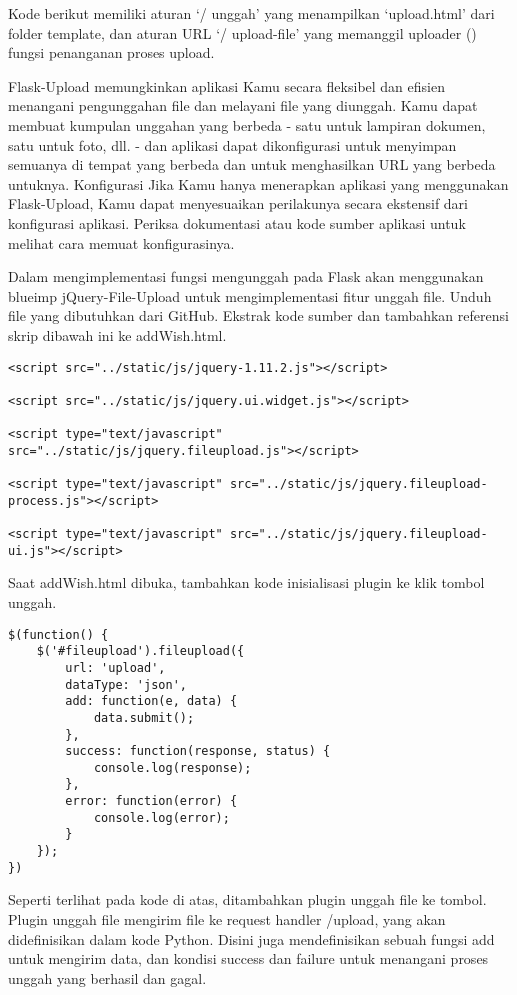 \documentclass[12pt,a4paper]{article}
\begin{document}
Kode berikut memiliki aturan ‘/ unggah’ yang menampilkan ‘upload.html’ dari folder template, dan aturan URL ‘/ upload-file’ yang memanggil uploader () fungsi penanganan proses upload.

Flask-Upload memungkinkan aplikasi Kamu secara fleksibel dan efisien menangani pengunggahan file dan melayani file yang diunggah. Kamu dapat membuat kumpulan unggahan yang berbeda - satu untuk lampiran dokumen, satu untuk foto, dll. - dan aplikasi dapat dikonfigurasi untuk menyimpan semuanya di tempat yang berbeda dan untuk menghasilkan URL yang berbeda untuknya.
Konfigurasi
Jika Kamu hanya menerapkan aplikasi yang menggunakan Flask-Upload, Kamu dapat menyesuaikan perilakunya secara ekstensif dari konfigurasi aplikasi. Periksa dokumentasi atau kode sumber aplikasi untuk melihat cara memuat konfigurasinya.


Dalam mengimplementasi fungsi mengunggah pada Flask akan menggunakan blueimp jQuery-File-Upload untuk mengimplementasi fitur unggah file. Unduh file yang dibutuhkan dari GitHub. Ekstrak kode sumber dan tambahkan referensi skrip dibawah ini ke addWish.html.
\begin{verbatim}
<script src="../static/js/jquery-1.11.2.js"></script>
 
<script src="../static/js/jquery.ui.widget.js"></script>
 
<script type="text/javascript" src="../static/js/jquery.fileupload.js"></script>
 
<script type="text/javascript" src="../static/js/jquery.fileupload-process.js"></script>
 
<script type="text/javascript" src="../static/js/jquery.fileupload-ui.js"></script>
\end{verbatim}

Saat addWish.html dibuka, tambahkan kode inisialisasi plugin ke klik tombol unggah.

\begin{verbatim}
$(function() {
    $('#fileupload').fileupload({
        url: 'upload',
        dataType: 'json',
        add: function(e, data) {
            data.submit();
        },
        success: function(response, status) {
            console.log(response);
        },
        error: function(error) {
            console.log(error);
        }
    });
})
\end{verbatim}
Seperti terlihat pada kode di atas, ditambahkan plugin unggah file ke tombol. Plugin unggah file mengirim file ke request handler /upload, yang akan didefinisikan dalam kode Python. Disini juga mendefinisikan sebuah fungsi add untuk mengirim data, dan kondisi success dan failure untuk menangani proses unggah yang berhasil dan gagal.
\end{document}
